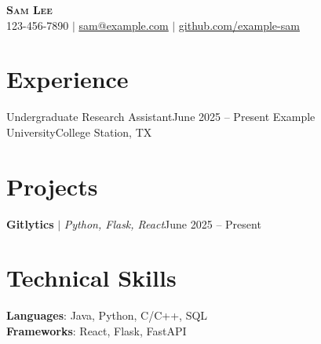 \documentclass[letter,11pt]{article}
\begin{document}
\begin{center}
    \textbf{\Huge \scshape Sam Lee} \\ \vspace{1pt}
    \small 123-456-7890 $|$ \href{mailto:sam@example.com}{\underline{sam@example.com}} $|$
    \href{https://github.com/example-sam}{\underline{github.com/example-sam}}
\end{center}

\section{Experience}
  \resumeSubHeadingListStart
    \resumeSubheading
      {Undergraduate Research Assistant}{June 2025 -- Present}
      {Example University}{College Station, TX}
      \resumeItemListStart
      \resumeItemListEnd
  \resumeSubHeadingListEnd

\section{Projects}
    \resumeSubHeadingListStart
      \resumeProjectHeading
          {\textbf{Gitlytics} $|$ \emph{Python, Flask, React}}{June 2025 -- Present}
          \resumeItemListStart
          \resumeItemListEnd
    \resumeSubHeadingListEnd

\section{Technical Skills}
 \begin{itemize}[leftmargin=0.15in, label={}]
    \small{\item{
     \textbf{Languages}{: Java, Python, C/C++, SQL} \\
     \textbf{Frameworks}{: React, Flask, FastAPI}
    }}
 \end{itemize}
\end{document}
